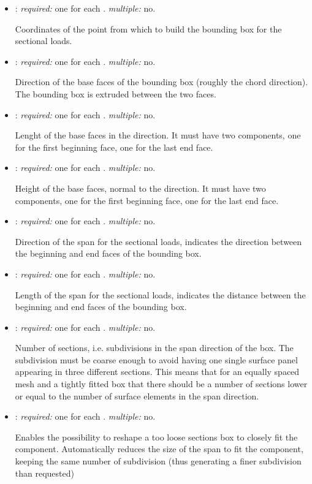 \begin{itemize}
\item {}: \textit{required:} one for each . 
\textit{multiple:} no.

Coordinates of the point from which to build the bounding box for the sectional loads.

\item {}: \textit{required:} one for each . 
\textit{multiple:} no.

Direction of the base faces of the bounding box (roughly the chord direction). 
The bounding box is extruded between the two faces. 

\item {}: \textit{required:} one for each . 
\textit{multiple:} no.

Lenght of the base faces in the  direction. It must have 
two components, one for the first beginning face, one for the last end face. 

\item {}: \textit{required:} one for each . 
\textit{multiple:} no.

Height of the base faces, normal to the  direction. It must 
have two components, one for the first beginning face, one for the last end face. 

\item {}: \textit{required:} one for each . 
\textit{multiple:} no.

Direction of the span for the sectional loads, indicates the direction between 
the beginning and end faces of the bounding box.

\item {}: \textit{required:} one for each . 
\textit{multiple:} no.

Length of the span for the sectional loads, indicates the distance between 
the beginning and end faces of the bounding box.

\item {}: \textit{required:} one for each . 
\textit{multiple:} no.

Number of sections, i.e. subdivisions in the span direction of the box. 
The subdivision must be coarse enough to avoid having one single surface 
panel appearing in three different sections. This means that for an equally 
spaced mesh and a tightly fitted box that there should be a number of 
sections lower or equal to the number of surface elements in the span 
direction. 

\item {}: \textit{required:} one for each . 
\textit{multiple:} no.

Enables the possibility to reshape a too loose sections box to closely 
fit the component. Automatically reduces the size of the span to fit the 
component, keeping the same number of subdivision (thus generating a 
finer subdivision than requested)

\end{itemize}

